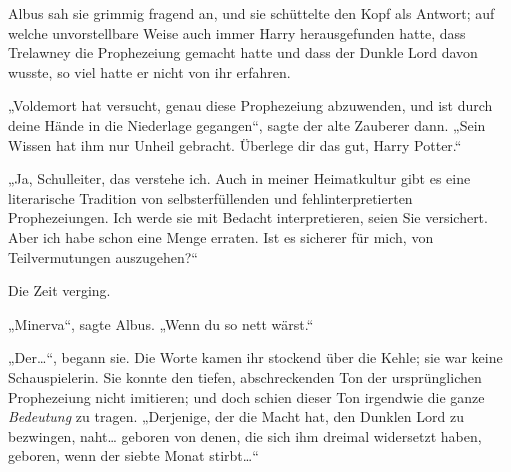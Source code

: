 Albus sah sie grimmig fragend an, und sie schüttelte den Kopf als Antwort; auf welche unvorstellbare Weise auch immer Harry herausgefunden hatte, dass Trelawney die Prophezeiung gemacht hatte und dass der Dunkle Lord davon wusste, so viel hatte er nicht von ihr erfahren.

„Voldemort hat versucht, genau diese Prophezeiung abzuwenden, und ist durch deine Hände in die Niederlage gegangen“, sagte der alte Zauberer dann. „Sein Wissen hat ihm nur Unheil gebracht. Überlege dir das gut, Harry Potter.“

„Ja, Schulleiter, das verstehe ich. Auch in meiner Heimatkultur gibt es eine literarische Tradition von selbsterfüllenden und fehlinterpretierten Prophezeiungen. Ich werde sie mit Bedacht interpretieren, seien Sie versichert. Aber ich habe schon eine Menge erraten. Ist es sicherer für mich, von Teilvermutungen auszugehen?“

Die Zeit verging.

„Minerva“, sagte Albus. „Wenn du so nett wärst.“

„Der…“, begann sie. Die Worte kamen ihr stockend über die Kehle; sie war keine Schauspielerin. Sie konnte den tiefen, abschreckenden Ton der ursprünglichen Prophezeiung nicht imitieren; und doch schien dieser Ton irgendwie die ganze \emph{Bedeutung} zu tragen. „Derjenige, der die Macht hat, den Dunklen Lord zu bezwingen, naht… geboren von denen, die sich ihm dreimal widersetzt haben, geboren, wenn der siebte Monat stirbt…“

